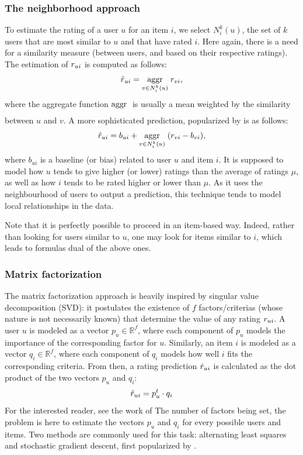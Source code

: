 \subsubsection{The neighborhood approach}
To estimate the rating of a user $u$ for an item $i$, we select $N_i^k(u)$, the
set of $k$ users that are most similar to $u$ and that have rated $i$. Here
again, there is a need for a similarity measure (between users, and based on
their respective ratings). The estimation of $r_{ui}$ is computed as follows:
$$\hat{r}_{ui} = \underset{v \in N_i^k(u)}{\operatorname{aggr}}\;r_{vi},$$
where the aggregate function $\underset{}{\operatorname{aggr}}\;$ is usually a mean weighted by the
similarity between $u$ and $v$. A more sophisticated prediction, popularized by
\cite{BelKorSIGKDD2007} is as follows:
$$\hat{r}_{ui} = b_{ui} + \underset{v \in N_i^k(u)}{\operatorname{aggr}}\;(r_{vi} - b_{vi}),$$
where $b_{ui}$ is a baseline (or bias) related to user $u$ and item $i$. It
is supposed to model how $u$ tends to give higher (or lower) ratings than the
average of ratings $\mu$, as well as how $i$ tends to be rated higher or lower
than $\mu$. As it uses the neighbourhood of users to output a prediction, this
technique tends to model local relationships in the data.

Note that it is perfectly possible to proceed in an item-based way. Indeed,
rather than looking for users similar to $u$, one may look for items similar to
$i$, which leads to formulas dual of the above ones.

\subsubsection{Matrix factorization}

The matrix factorization approach is heavily inspired by singular value
decomposition (SVD): it postulates the existence of $f$ factors/criterias
(whose nature is not necessarily known) that determine the value of any rating
$r_{ui}$.  A user $u$ is modeled as a vector $p_u \in \mathbb{R}^f$, where each
component of $p_u$ models the importance of the corresponding factor for $u$.
Similarly, an item $i$ is modeled as a vector $q_i \in \mathbb{R}^f$, where
each component of $q_i$ models how well $i$ fits the corresponding criteria.
From then, a rating prediction $\hat{r}_{ui}$ is calculated as the dot product
of the two vectors $p_u$ and $q_i$: $$\hat{r}_{ui} = p_u^t \cdot q_i$$ For the
interested reader, see the work of
\cite{Funk2006,KorACM2010} The number of factors being set,
the problem is here to estimate the vectors $p_u$ and $q_i$ for every possible
users and items. Two methods are commonly used for this task: alternating least
squares and stochastic gradient descent, first popularized by \cite{Funk2006}.

